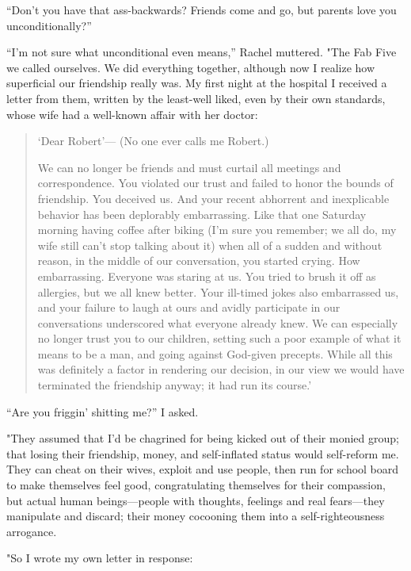 ``Don't you have that ass-backwards? Friends come and go, but parents
love you unconditionally?''

``I'm not sure what unconditional even means,'' Rachel muttered. "The
Fab Five we called ourselves. We did everything together, although now I
realize how superficial our friendship really was. My first night at the
hospital I received a letter from them, written by the least-well liked,
even by their own standards, whose wife had a well-known affair with her
doctor:

\begin{quote}
`Dear Robert'--- (No one ever calls me Robert.)

We can no longer be friends and must curtail all meetings and
correspondence. You violated our trust and failed to honor the bounds of
friendship. You deceived us. And your recent abhorrent and inexplicable
behavior has been deplorably embarrassing. Like that one Saturday
morning having coffee after biking (I'm sure you remember; we all do, my
wife still can't stop talking about it) when all of a sudden and without
reason, in the middle of our conversation, you started crying. How
embarrassing. Everyone was staring at us. You tried to brush it off as
allergies, but we all knew better. Your ill-timed jokes also embarrassed
us, and your failure to laugh at ours and avidly participate in our
conversations underscored what everyone already knew. We can especially
no longer trust you to our children, setting such a poor example of what
it means to be a man, and going against God-given precepts. While all
this was definitely a factor in rendering our decision, in our view we
would have terminated the friendship anyway; it had run its course.'
\end{quote}

``Are you friggin' shitting me?'' I asked.

"They assumed that I'd be chagrined for being kicked out of their monied
group; that losing their friendship, money, and self-inflated status
would self-reform me. They can cheat on their wives, exploit and use
people, then run for school board to make themselves feel good,
congratulating themselves for their compassion, but actual human
beings---people with thoughts, feelings and real fears---they manipulate
and discard; their money cocooning them into a self-righteousness
arrogance.

"So I wrote my own letter in response:

